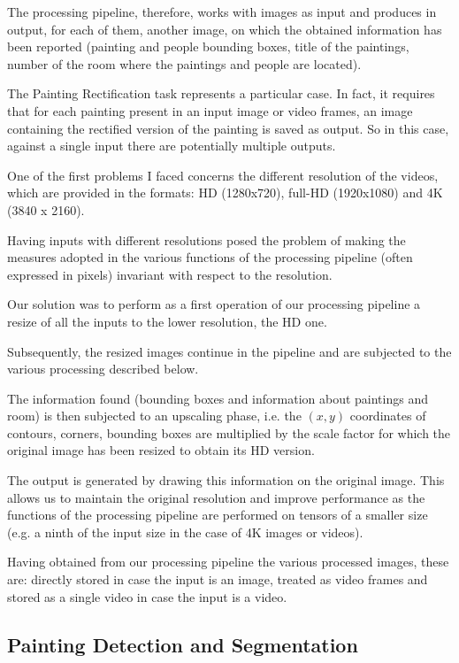 \documentclass[10pt,twocolumn,letterpaper]{article}
\begin{document}
The processing pipeline, therefore, works with images as input and produces in output, for each of them, another image, on which the obtained information has been reported (painting and people bounding boxes, title of the paintings, number of the room where the paintings and people are located).

The Painting Rectification task represents a particular case. In fact, it requires that for each painting present in an input image or video frames, an image containing the rectified version of the painting is saved as output. So in this case, against a single input there are potentially multiple outputs.

One of the first problems I faced concerns the different resolution of the videos, which are provided in the formats: HD (1280x720), full-HD (1920x1080) and 4K (3840 x 2160).

Having inputs with different resolutions posed the problem of making the measures adopted in the various functions of the processing pipeline (often expressed in pixels) invariant with respect to the resolution.

Our solution was to perform as a first operation of our processing pipeline a resize of all the inputs to the lower resolution, the HD one.

Subsequently, the resized images continue in the pipeline and are subjected to the various processing described below.

The information found (bounding boxes and information about paintings and room) is then subjected to an upscaling phase, i.e. the $(x, y)$ coordinates of contours, corners, bounding boxes are multiplied by the scale factor for which the original image has been resized to obtain its HD version.

The output is generated by drawing this information on the original image. This allows us to maintain the original resolution and improve performance as the functions of the processing pipeline are performed on tensors of a smaller size (e.g. a ninth of the input size in the case of 4K images or videos). 

Having obtained from our processing pipeline the various processed images, these are: directly stored in case the input is an image, treated as video frames and stored as a single video in case the input is a video.

\subsection{Painting Detection and Segmentation}
\end{document}
